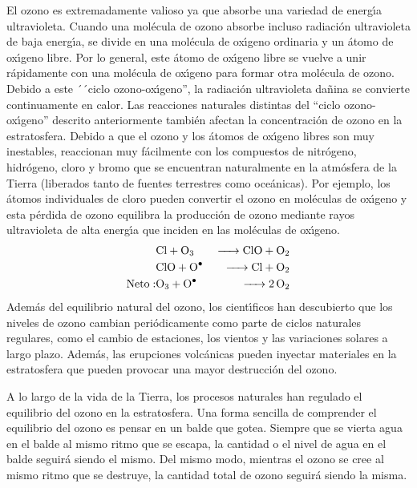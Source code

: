 El ozono es extremadamente valioso ya que absorbe una variedad de energ\'{\i}a ultravioleta. Cuando una mol\'ecula de ozono absorbe incluso radiaci\'on ultravioleta de baja energ\'{\i}a, se divide en una mol\'ecula de ox\'{\i}geno ordinaria y un \'atomo de ox\'{\i}geno libre. Por lo general, este \'atomo de ox\'{\i}geno libre se vuelve a unir r\'apidamente con una mol\'ecula de ox\'{\i}geno para formar otra mol\'ecula de ozono. Debido a este ´´ciclo ozono-ox\'{\i}geno'', la  radiaci\'on ultravioleta da\~nina se convierte continuamente en calor.
Las reacciones naturales distintas del ``ciclo ozono-ox\'{\i}geno'' descrito anteriormente tambi\'en afectan la concentraci\'on de ozono en la estratosfera. Debido a que el ozono y los \'atomos de ox\'{\i}geno libres son muy inestables, reaccionan muy f\'acilmente con los compuestos de nitr\'ogeno, hidr\'ogeno, cloro y bromo que se encuentran naturalmente en la atm\'osfera de la Tierra (liberados tanto de fuentes terrestres como oce\'anicas). Por ejemplo, los \'atomos individuales de cloro pueden convertir el ozono en mol\'eculas de ox\'{\i}geno y esta p\'erdida de ozono equilibra la producci\'on de ozono mediante rayos ultravioleta de alta energ\'{\i}a que inciden en las mol\'eculas de ox\'{\i}geno.
\begin{eqnarray*}
 &\ce{Cl + O3 & -> ClO + O2  \\
 &ClO +  O^.  & -> Cl + O2 }\\ 
  \mathrm{Neto: } &\ce{O3 + O^.  &  -> 2O2}
\end{eqnarray*}
Adem\'as del equilibrio natural del ozono, los cient\'{\i}ficos han descubierto que los niveles de ozono cambian peri\'odicamente como parte de ciclos naturales regulares, como el cambio de estaciones, los vientos y las variaciones solares a largo plazo. Adem\'as, las erupciones volc\'anicas pueden inyectar materiales en la estratosfera que pueden provocar una mayor destrucci\'on del ozono.

A lo largo de la vida de la Tierra, los procesos naturales han regulado el equilibrio del ozono en la estratosfera. Una forma sencilla de comprender el equilibrio del ozono es pensar en un balde que gotea. Siempre que se vierta agua en el balde al mismo ritmo que se escapa, la cantidad o el nivel de agua en el balde seguir\'a siendo el mismo. Del mismo modo, mientras el ozono se cree al mismo ritmo que se destruye, la cantidad total de ozono seguir\'a siendo la misma.

